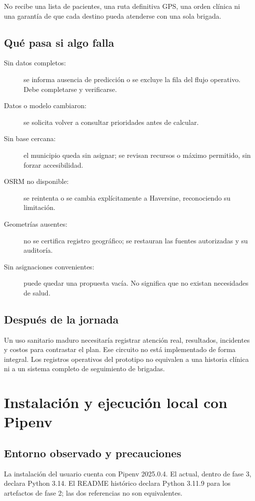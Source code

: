 \documentclass[11pt,a4paper]{report}
\newcommand{\campo}[1]{\texttt{\detokenize{#1}}}
\begin{document}
No recibe una lista de pacientes, una ruta definitiva GPS, una orden clínica ni una garantía de que cada destino pueda atenderse con una sola brigada.

\section{Qué pasa si algo falla}
\begin{description}
\item[Sin datos completos:] se informa ausencia de predicción o se excluye la fila del flujo operativo. Debe completarse y verificarse.
\item[Datos o modelo cambiaron:] se solicita volver a consultar prioridades antes de calcular.
\item[Sin base cercana:] el municipio queda sin asignar; se revisan recursos o máximo permitido, sin forzar accesibilidad.
\item[OSRM no disponible:] se reintenta o se cambia explícitamente a Haversine, reconociendo su limitación.
\item[Geometrías ausentes:] no se certifica registro geográfico; se restauran las fuentes autorizadas y su auditoría.
\item[Sin asignaciones convenientes:] puede quedar una propuesta vacía. No significa que no existan necesidades de salud.
\end{description}

\section{Después de la jornada}
Un uso sanitario maduro necesitaría registrar atención real, resultados, incidentes y costos para contrastar el plan. Ese circuito no está implementado de forma integral. Los registros operativos del prototipo no equivalen a una historia clínica ni a un sistema completo de seguimiento de brigadas.

\chapter{Instalación y ejecución local con Pipenv}
\section{Entorno observado y precauciones}
La instalación del usuario cuenta con Pipenv 2025.0.4. El \campo{Pipfile} actual, dentro de fase 3, declara Python 3.14. El README histórico declara Python 3.11.9 para los artefactos de fase 2; las dos referencias no son equivalentes.
\end{document}
